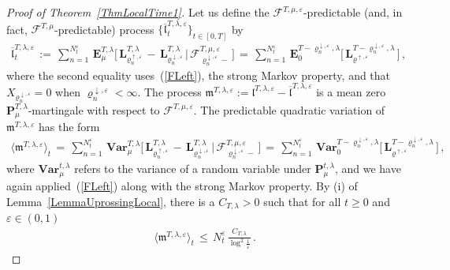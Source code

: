 \documentclass[10pt]{article}
\numberwithin{equation}{section}
\theoremstyle{definition}
\begin{document}
\begin{proof}[Proof of Theorem~\ref{ThmLocalTime1}]
Let us define the $\boldsymbol{\mathscr{F}}^{T,\mu,\varepsilon}$-predictable (and, in fact, $\mathscr{F}^{T,\mu}$-predictable)  process $\big\{\overline{\mathfrak{l}}_{t}^{T,\lambda,\varepsilon}\big\}_{t\in [0,T]}$ by
\begin{align*}
\overline{\mathfrak{l}}_{t}^{T,\lambda,\varepsilon}\,:=\,\sum_{n=1}^{ N_{t}^{\varepsilon} }\,\mathbf{E}_{\mu}^{T,\lambda}\Big[\,\mathbf{L}_{\varrho_{n}^{\uparrow,\varepsilon}}^{T,\lambda}\,-\,\mathbf{L}_{\varrho_{n}^{\downarrow,\varepsilon}}^{T,\lambda} \,\Big|\,\mathscr{F}_{\varrho_{n}^{\downarrow,\varepsilon}-}^{T,\mu,\varepsilon}\,\Big]  \,=\,\sum_{n=1}^{ N_{t}^{\varepsilon} }  \,\mathbf{E}_{0}^{T-\varrho_{n}^{\downarrow,\varepsilon},\lambda}\Big[\,\mathbf{L}_{\varrho^{\uparrow,\varepsilon}}^{T-\varrho_{n}^{\downarrow,\varepsilon},\lambda}\,\Big] \,, \nonumber
\end{align*}
where the second equality uses~(\ref{FLeft}), the strong Markov property, and that $X_{\varrho_{n}^{\downarrow,\varepsilon}}=0$ when $\varrho_{n}^{\downarrow,\varepsilon}<\infty$.    The process  $\mathfrak{m}^{T,\lambda,\varepsilon}:=\mathfrak{l}^{T,\lambda,\varepsilon}-\overline{\mathfrak{l}}^{T,\lambda,\varepsilon}$ is a mean zero  $\mathbf{P}_{\mu}^{T,\lambda} $-martingale with respect to $\boldsymbol{\mathscr{F}}^{T,\mu,\varepsilon}$.  The predictable quadratic variation of $\mathfrak{m}^{T,\lambda,\varepsilon}$ has the form
\begin{align*}
    \big\langle \mathfrak{m}^{T,\lambda,\varepsilon}\big\rangle_t \,=\,\sum_{n=1}^{ N_{t}^{\varepsilon} } \,  \mathbf{Var}_{\mu}^{T,\lambda}\Big[\,\mathbf{L}_{\varrho_{n}^{\uparrow,\varepsilon}}^{T,\lambda}\,-\,\mathbf{L}_{\varrho_{n}^{\downarrow,\varepsilon}}^{T,\lambda} \,\Big|\,\mathscr{F}_{\varrho_{n}^{\downarrow,\varepsilon}-}^{T,\mu,\varepsilon}\,\Big]\,=\,\sum_{n=1}^{ N_{t}^{\varepsilon} }  \, \mathbf{Var}_{0}^{T-\varrho_{n}^{\downarrow,\varepsilon},\lambda}\Big[\,\mathbf{L}_{\varrho^{\uparrow,\varepsilon}}^{T-\varrho_{n}^{\downarrow,\varepsilon},\lambda}\,\Big]\,,
\end{align*}
where $ \mathbf{Var}_{\mu}^{t,\lambda}$ refers to  the variance of a random variable  under $ \mathbf{P}_{\mu}^{t,\lambda}$, and we have again applied~(\ref{FLeft}) along with the strong Markov property. By (i) of Lemma~\ref{LemmaUprossingLocal}, there is a $C_{T,\lambda}>0$ such that for all $t\geq 0$ and $\varepsilon\in (0,1)$
\begin{align}\label{QuadVarBound}
    \big\langle \mathfrak{m}^{T,\lambda,\varepsilon}\big\rangle_t \,\leq \,  N_{t}^{\varepsilon }\,\frac{ C_{T,\lambda} }{ \log^2\frac{1}{\varepsilon} }  \,.

\end{align}
\end{proof}
\end{document}
